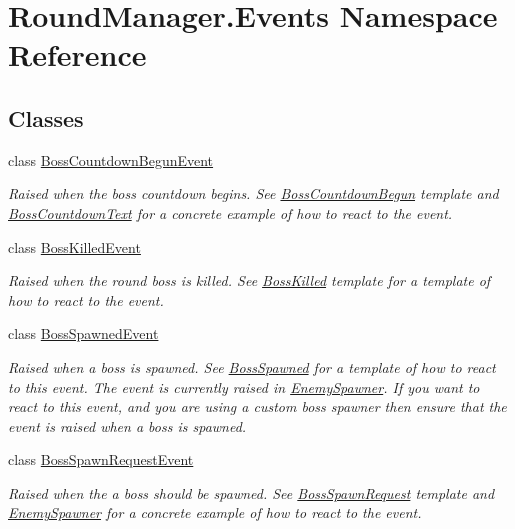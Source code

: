 \hypertarget{namespace_round_manager_1_1_events}{}\section{Round\+Manager.\+Events Namespace Reference}
\label{namespace_round_manager_1_1_events}
\subsection*{Classes}
\begin{DoxyCompactItemize}
\item 
class \hyperlink{class_round_manager_1_1_events_1_1_boss_countdown_begun_event}{Boss\+Countdown\+Begun\+Event}
\begin{DoxyCompactList}\small\item\em Raised when the boss countdown begins. See \hyperlink{class_round_manager_1_1_boss_countdown_begun}{Boss\+Countdown\+Begun} template and \hyperlink{class_round_manager_1_1_boss_countdown_text}{Boss\+Countdown\+Text} for a concrete example of how to react to the event. \end{DoxyCompactList}\item 
class \hyperlink{class_round_manager_1_1_events_1_1_boss_killed_event}{Boss\+Killed\+Event}
\begin{DoxyCompactList}\small\item\em Raised when the round boss is killed. See \hyperlink{class_round_manager_1_1_boss_killed}{Boss\+Killed} template for a template of how to react to the event. \end{DoxyCompactList}\item 
class \hyperlink{class_round_manager_1_1_events_1_1_boss_spawned_event}{Boss\+Spawned\+Event}
\begin{DoxyCompactList}\small\item\em Raised when a boss is spawned. See \hyperlink{class_round_manager_1_1_boss_spawned}{Boss\+Spawned} for a template of how to react to this event. The event is currently raised in \hyperlink{class_round_manager_1_1_enemy_spawner}{Enemy\+Spawner}. If you want to react to this event, and you are using a custom boss spawner then ensure that the event is raised when a boss is spawned. \end{DoxyCompactList}\item 
class \hyperlink{class_round_manager_1_1_events_1_1_boss_spawn_request_event}{Boss\+Spawn\+Request\+Event}
\begin{DoxyCompactList}\small\item\em Raised when the a boss should be spawned. See \hyperlink{class_round_manager_1_1_boss_spawn_request}{Boss\+Spawn\+Request} template and \hyperlink{class_round_manager_1_1_enemy_spawner}{Enemy\+Spawner} for a concrete example of how to react to the event. \end{DoxyCompactList}\item 

\end{DoxyCompactItemize}
